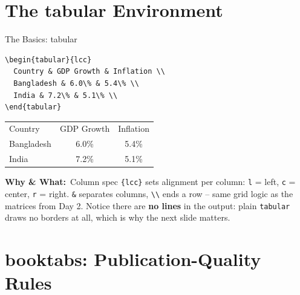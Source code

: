 \documentclass[11pt,aspectratio=169]{beamer}
\newcommand{\whybox}[1]{%
  \vspace{2pt}
  {\scriptsize\raggedright\textcolor{red!55!black}{\textbf{Why \& What:}}~#1\par}
}
\begin{document}
\section{The tabular Environment}

\begin{frame}[fragile]{The Basics: tabular}
  \begin{lstlisting}
\begin{tabular}{lcc}
  Country & GDP Growth & Inflation \\
  Bangladesh & 6.0\% & 5.4\% \\
  India & 7.2\% & 5.1\% \\
\end{tabular}
  \end{lstlisting}
  \begin{outputbox}
    \small
    \begin{tabular}{lcc}
      Country & GDP Growth & Inflation \\
      Bangladesh & 6.0\% & 5.4\% \\
      India & 7.2\% & 5.1\% \\
    \end{tabular}
  \end{outputbox}
  \whybox{Column spec \texttt{\{lcc\}} sets alignment per column:
  \texttt{l} = left, \texttt{c} = center, \texttt{r} = right.
  \texttt{\&} separates columns, \texttt{\textbackslash\textbackslash}
  ends a row -- same grid logic as the matrices from Day 2. Notice
  there are \textbf{no lines} in the output: plain \texttt{tabular}
  draws no borders at all, which is why the next slide matters.}
\end{frame}

\section{booktabs: Publication-Quality Rules}
\end{document}
